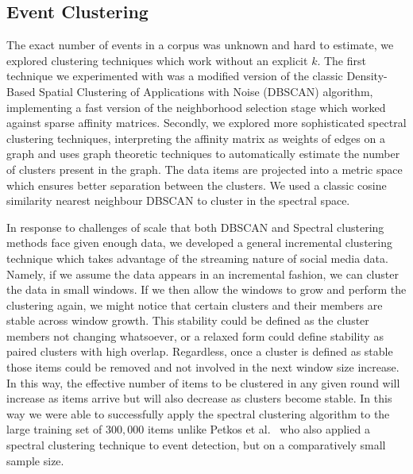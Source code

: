 \documentclass{../acm_proc_article-me11_tweaked}
\begin{document}

\subsection{Event Clustering} %
\label{sub:event_clustering}

The exact number of events in a corpus was unknown and hard to estimate, we explored clustering techniques which work without an explicit $k$. The first technique we experimented with was a modified version of the classic Density-Based Spatial Clustering of Applications with Noise  (DBSCAN) algorithm, implementing a fast version of the neighborhood selection stage which worked against sparse affinity matrices. Secondly, we explored more sophisticated spectral clustering techniques, interpreting the affinity matrix as weights of edges on a graph and uses graph theoretic techniques to automatically estimate the number of clusters present in the graph. The data items are projected into a metric space which ensures better separation between the clusters. We used a classic cosine similarity nearest neighbour DBSCAN to cluster in the spectral space. 

In response to challenges of scale that both DBSCAN and Spectral clustering methods face given enough data, we developed a general incremental clustering technique which takes advantage of the streaming nature of social media data. Namely, if we assume the data appears in an incremental fashion, we can cluster the data in small windows. If we then allow the windows to grow and perform the clustering again, we might notice that certain clusters and their members are stable across window growth. This stability could be defined as the cluster members not changing whatsoever, or a relaxed form could define stability as paired clusters with high overlap. Regardless, once a cluster is defined as stable those items could be removed and not involved in the next window size increase. In this way, the effective number of items to be clustered in any given round will increase as items arrive but will also decrease as clusters become stable. In this way we were able to successfully apply the spectral clustering algorithm to the large training set of $300,000$ items unlike Petkos et al.~\cite{Petkos:2012:SED:2324796.2324825} who also applied a spectral clustering technique to event detection, but on a comparatively small sample size.
\end{document}
